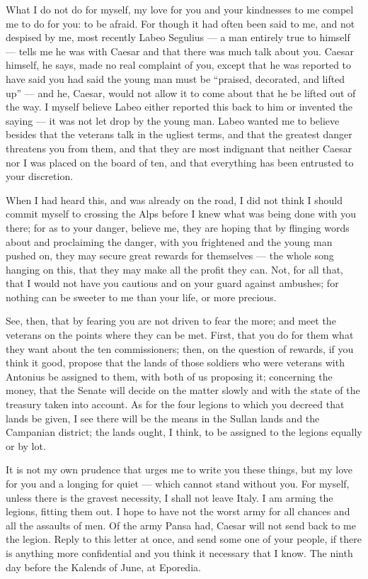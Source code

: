 

 What I do not do for myself, my love for you and your kindnesses to me compel me to do for you: to be afraid. For though it had often been said to me, and not despised by me, most recently Labeo Segulius --- a man entirely true to himself --- tells me he was with Caesar and that there was much talk about you. Caesar himself, he says, made no real complaint of you, except that he was reported to have said you had said the young man must be ``praised, decorated, and lifted up'' --- and he, Caesar, would not allow it to come about that he be lifted out of the way. I myself believe Labeo either reported this back to him or invented the saying --- it was not let drop by the young man. Labeo wanted me to believe besides that the veterans talk in the ugliest terms, and that the greatest danger threatens you from them, and that they are most indignant that neither Caesar nor I was placed on the board of ten, and that everything has been entrusted to your discretion.

 When I had heard this, and was already on the road, I did not think I should commit myself to crossing the Alps before I knew what was being done with you there; for as to your danger, believe me, they are hoping that by flinging words about and proclaiming the danger, with you frightened and the young man pushed on, they may secure great rewards for themselves --- the whole song hanging on this, that they may make all the profit they can. Not, for all that, that I would not have you cautious and on your guard against ambushes; for nothing can be sweeter to me than your life, or more precious.

 See, then, that by fearing you are not driven to fear the more; and meet the veterans on the points where they can be met. First, that you do for them what they want about the ten commissioners; then, on the question of rewards, if you think it good, propose that the lands of those soldiers who were veterans with Antonius be assigned to them, with both of us proposing it; concerning the money, that the Senate will decide on the matter slowly and with the state of the treasury taken into account. As for the four legions to which you decreed that lands be given, I see there will be the means in the Sullan lands and the Campanian district; the lands ought, I think, to be assigned to the legions equally or by lot.

 It is not my own prudence that urges me to write you these things, but my love for you and a longing for quiet --- which cannot stand without you. For myself, unless there is the gravest necessity, I shall not leave Italy. I am arming the legions, fitting them out. I hope to have not the worst army for all chances and all the assaults of men. Of the army Pansa had, Caesar will not send back to me the legion. Reply to this letter at once, and send some one of your people, if there is anything more confidential and you think it necessary that I know. The ninth day before the Kalends of June, at Eporedia.
